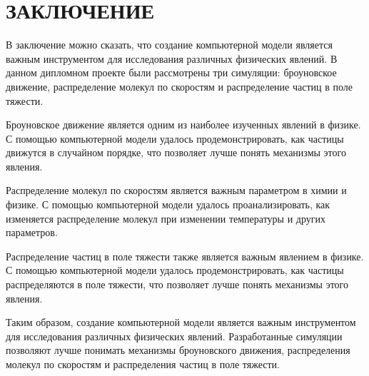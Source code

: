 \chapter*{ЗАКЛЮЧЕНИЕ}
\label{ch:concl}

В заключение можно сказать, что создание компьютерной модели является важным инструментом для исследования различных физических явлений. В данном дипломном проекте были рассмотрены три симуляции: броуновское движение, распределение молекул по скоростям и распределение частиц в поле тяжести.

Броуновское движение является одним из наиболее изученных явлений в физике. С помощью компьютерной модели удалось продемонстрировать, как частицы движутся в случайном порядке, что позволяет лучше понять механизмы этого явления.

Распределение молекул по скоростям является важным параметром в химии и физике. С помощью компьютерной модели удалось проанализировать, как изменяется распределение молекул при изменении температуры и других параметров.

Распределение частиц в поле тяжести также является важным явлением в физике. С помощью компьютерной модели удалось продемонстрировать, как частицы распределяются в поле тяжести, что позволяет лучше понять механизмы этого явления.

Таким образом, создание компьютерной модели является важным инструментом для исследования различных физических явлений. Разработанные симуляции позволяют лучше понимать механизмы броуновского движения, распределения молекул по скоростям и распределения частиц в поле тяжести.